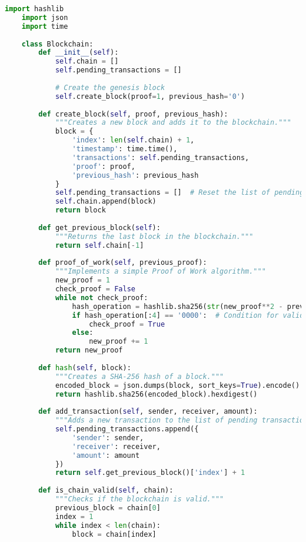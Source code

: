 \documentclass[11pt]{article}
\begin{document}
\begin{lstlisting}[language=Python]
    import hashlib
    import json
    import time
    
    class Blockchain:
        def __init__(self):
            self.chain = []
            self.pending_transactions = []
            
            # Create the genesis block
            self.create_block(proof=1, previous_hash='0')
    
        def create_block(self, proof, previous_hash):
            """Creates a new block and adds it to the blockchain."""
            block = {
                'index': len(self.chain) + 1,
                'timestamp': time.time(),
                'transactions': self.pending_transactions,
                'proof': proof,
                'previous_hash': previous_hash
            }
            self.pending_transactions = []  # Reset the list of pending transactions
            self.chain.append(block)
            return block
    
        def get_previous_block(self):
            """Returns the last block in the blockchain."""
            return self.chain[-1]
    
        def proof_of_work(self, previous_proof):
            """Implements a simple Proof of Work algorithm."""
            new_proof = 1
            check_proof = False
            while not check_proof:
                hash_operation = hashlib.sha256(str(new_proof**2 - previous_proof**2).encode()).hexdigest()
                if hash_operation[:4] == '0000':  # Condition for valid proof
                    check_proof = True
                else:
                    new_proof += 1
            return new_proof
    
        def hash(self, block):
            """Creates a SHA-256 hash of a block."""
            encoded_block = json.dumps(block, sort_keys=True).encode()
            return hashlib.sha256(encoded_block).hexdigest()
    
        def add_transaction(self, sender, receiver, amount):
            """Adds a new transaction to the list of pending transactions."""
            self.pending_transactions.append({
                'sender': sender,
                'receiver': receiver,
                'amount': amount
            })
            return self.get_previous_block()['index'] + 1
    
        def is_chain_valid(self, chain):
            """Checks if the blockchain is valid."""
            previous_block = chain[0]
            index = 1
            while index < len(chain):
                block = chain[index]
                

\end{lstlisting}
\end{document}
